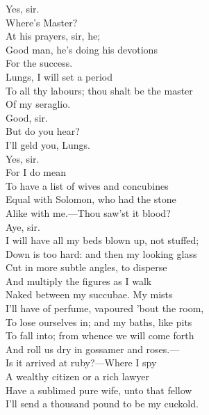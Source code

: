 \documentclass[a4paper,oneside,12pt]{memoir}
\begin{document}
\begin{drama*}
\facespeaks Yes, sir.\\
\mammonspeaks {} Where's Master?\\
\facespeaks {} At his prayers, sir, he;\\
Good man, he's doing his devotions\\
For the success.\\
\mammonspeaks {} Lungs, I will set a period\\
To all thy labours; thou shalt be the master\\
Of my seraglio.\\
\facespeaks {} Good, sir.\\
\mammonspeaks {} But do you hear?\\
I'll geld you, Lungs.\\
\facespeaks {} Yes, sir.\\
\mammonspeaks {} For I do mean\\
To have a list of wives and concubines\\
Equal with Solomon, who had the stone\\
Alike with me.---Thou saw'st it blood?\\
\facespeaks {} Aye, sir.\\
\mammonspeaks I will have all my beds blown up, not stuffed;\\
Down is too hard: and then my looking glass\\
Cut in more subtle angles, to disperse\\
And multiply the figures as I walk\\
Naked between my succubae. My mists\\
I'll have of perfume, vapoured 'bout the room,\\
To lose ourselves in; and my baths, like pits\\
To fall into; from whence we will come forth\\
And roll us dry in gossamer and roses.---\\
Is it arrived at ruby?---Where I spy\\
A wealthy citizen or a rich lawyer\\
Have a sublimed pure wife, unto that fellow\\
I'll send a thousand pound to be my cuckold.\\

\end{drama*}
\end{document}
